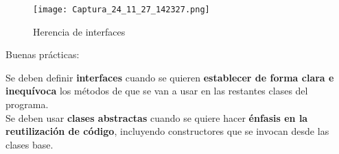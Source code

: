 \documentclass{article}
\begin{document}
\begin{figure}[h]
    \centering
    \texttt{[image: Captura\_24\_11\_27\_142327.png]}
    \caption{Herencia de interfaces}
\end{figure}

Buenas prácticas: 

Se deben definir \textbf{interfaces} cuando se quieren \textbf{establecer de forma clara e inequívoca} los métodos de que se van a usar en las restantes clases del programa. \\

Se deben usar \textbf{clases abstractas} cuando se quiere hacer \textbf{énfasis en la reutilización de código}, incluyendo constructores que se invocan desde las clases base.



\begin{comment}
\begin{figure}[h]
    \centering
    \texttt{[image: 1.png]}
    \caption{}
\end{figure}
\end{comment}

\begin{comment}
\begin{wrapfigure}[]{r}{0.45\linewidth}
    \centering
    \texttt{[image: 8.png]}
    \caption{}
\end{wrapfigure}
\end{comment}
\end{document}
